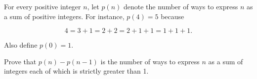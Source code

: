 For every positive integer \(n\), let \(p(n)\) denote the number of ways to express \(n\) as a sum of positive integers. For instance, \(p(4)=5\) because

\[4=3+1=2+2=2+1+1=1+1+1.\]

Also define \(p(0)=1\).

Prove that \(p(n)-p(n-1)\) is the number of ways to express \(n\) as a sum of integers each of which is strictly greater than 1.

